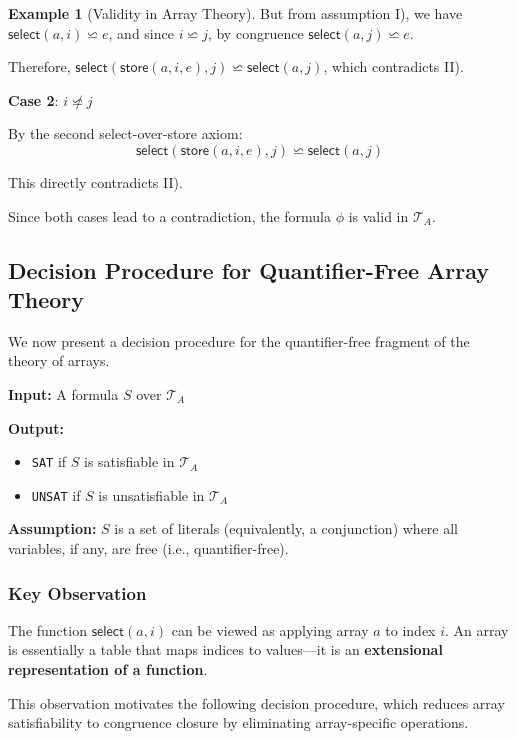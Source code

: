 \documentclass[11pt,a4paper]{article}
\theoremstyle{definition}
\newtheorem{example}{Example}[section]
\theoremstyle{plain}
\theoremstyle{remark}
\begin{document}
\begin{example}[Validity in Array Theory]
But from assumption I), we have $\textsf{select}(a, i) \backsimeq e$, and since $i \backsimeq j$, by congruence $\textsf{select}(a, j) \backsimeq e$.

Therefore, $\textsf{select}(\textsf{store}(a, i, e), j) \backsimeq \textsf{select}(a, j)$, which contradicts II).

\textbf{Case 2}: $i \not\backsimeq j$

By the second select-over-store axiom:
\[
\textsf{select}(\textsf{store}(a, i, e), j) \backsimeq \textsf{select}(a, j)
\]

This directly contradicts II).

Since both cases lead to a contradiction, the formula $\phi$ is valid in $\mathcal{T}_A$.
\end{example}


\subsection{Decision Procedure for Quantifier-Free Array Theory}

We now present a decision procedure for the quantifier-free fragment of the theory of arrays.

\begin{tcolorbox}[colback=blue!5!white,colframe=blue!75!black,title=\textbf{Decision Problem for $\mathcal{T}_A$}]
\textbf{Input:} A formula $S$ over $\mathcal{T}_A$

\textbf{Output:}
\begin{itemize}
    \item \texttt{SAT} if $S$ is satisfiable in $\mathcal{T}_A$
    \item \texttt{UNSAT} if $S$ is unsatisfiable in $\mathcal{T}_A$
\end{itemize}

\textbf{Assumption:} $S$ is a set of literals (equivalently, a conjunction) where all variables, if any, are free (i.e., quantifier-free).
\end{tcolorbox}

\subsubsection{Key Observation}

The function $\textsf{select}(a, i)$ can be viewed as applying array $a$ to index $i$. An array is essentially a table that maps indices to values—it is an \textbf{extensional representation of a function}.

This observation motivates the following decision procedure, which reduces array satisfiability to congruence closure by eliminating array-specific operations.
\end{document}
